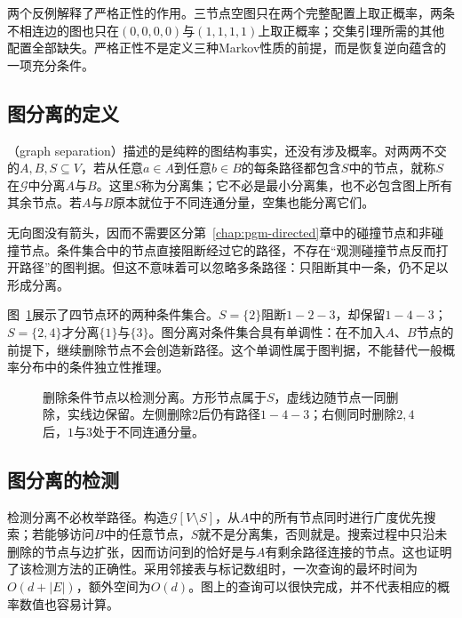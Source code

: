 两个反例解释了严格正性的作用。三节点空图只在两个完整配置上取正概率，两条不相连边的图也只在$(0,0,0,0)$与$(1,1,1,1)$上取正概率；交集引理所需的其他配置全部缺失。严格正性不是定义三种Markov性质的前提，而是恢复逆向蕴含的一项充分条件。

\subsection{图分离的定义}
\label{sec:pgm-undirected-separation}

（graph separation）描述的是纯粹的图结构事实，还没有涉及概率。对两两不交的$A,B,S\subseteq V$，若从任意$a\in A$到任意$b\in B$的每条路径都包含$S$中的节点，就称$S$在$\mathcal{G}$中分离$A$与$B$。这里$S$称为分离集；它不必是最小分离集，也不必包含图上所有其余节点。若$A$与$B$原本就位于不同连通分量，空集也能分离它们。

无向图没有箭头，因而不需要区分第~\ref{chap:pgm-directed}章中的碰撞节点和非碰撞节点。条件集合中的节点直接阻断经过它的路径，不存在“观测碰撞节点反而打开路径”的图判据。但这不意味着可以忽略多条路径：只阻断其中一条，仍不足以形成分离。

图~\ref{fig:pgm-undirected-separation}展示了四节点环的两种条件集合。$S=\{2\}$阻断$1-2-3$，却保留$1-4-3$；$S=\{2,4\}$才分离$\{1\}$与$\{3\}$。图分离对条件集合具有单调性：在不加入$A$、$B$节点的前提下，继续删除节点不会创造新路径。这个单调性属于图判据，不能替代一般概率分布中的条件独立性推理。

\begin{figure}[htbp]
  \centering
  
  \caption{删除条件节点以检测分离。方形节点属于$S$，虚线边随节点一同删除，实线边保留。左侧删除$2$后仍有路径$1-4-3$；右侧同时删除$2,4$后，$1$与$3$处于不同连通分量。}
  \label{fig:pgm-undirected-separation}
\end{figure}

\subsection{图分离的检测}
\label{sec:pgm-undirected-separation-test}

检测分离不必枚举路径。构造$\mathcal{G}[V\setminus S]$，从$A$中的所有节点同时进行广度优先搜索；若能够访问$B$中的任意节点，$S$就不是分离集，否则就是。搜索过程中只沿未删除的节点与边扩张，因而访问到的恰好是与$A$有剩余路径连接的节点。这也证明了该检测方法的正确性。采用邻接表与标记数组时，一次查询的最坏时间为$O(d+|E|)$，额外空间为$O(d)$。图上的查询可以很快完成，并不代表相应的概率数值也容易计算。

